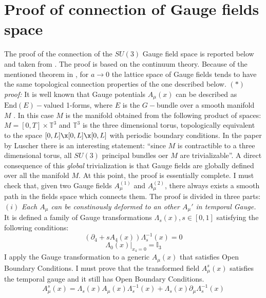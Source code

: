\documentclass[english, LaM, oneside, noexaminfo]{sapthesis}
\newcommand{\obc}{Open Boundary Conditions}
\begin{document}
\section{Proof of connection of Gauge fields space}\label{app:connection}
\noindent
The proof of the connection of the $SU(3)$ Gauge field space is reported below and taken from \cite{OBC_top}.
The proof is based on the continuum theory.
Because of the mentioned theorem in \cite{Topology-WilsonFlow-HMC}, for $a \rightarrow 0$ the lattice space of Gauge fields tends to have the same topological connection properties of the one described below.
\newline\newline
\textit{$(*)$ proof:}
\newline
It is well known that Gauge potentials $A_\mu (x)$ can be described as $\text{End}(E)-$valued 1-forms, where $E$ is the $G-$bundle over a smooth manifold $M$ \cite{Baez}.
In this case $M$ is the manifold obtained from the following product of spaces: $M = [0,T]\times \mathbb{T}^3$ and $\mathbb{T}^3$ is the three dimensional torus, topologically equivalent to the space $[0,L]\x[0,L]\x[0,L]$ with periodic boundary conditions.
\newline
In the paper by Luscher \cite{OBC_top} there is an interesting statement: ``since $M$ is contractible to a three dimensional torus, all $SU(3)$ principal bundles oer $M$ are trivializable''.
A direct consequence of this {\it global} trivialization is that Gauge fields are globally defined over all the manifold $M$.
\newline
At this point, the proof is essentially complete.
I must check that, given two Gauge fields $A_\mu^{(1)}$ and $A_\mu^{(2)}$, there always exists a smooth path in the fields space which connects them.
The proof is divided in three parts:
\newline
\newline
$(i)$ \textit{Each $A_\mu$ can be constinously deformed to an other ${A}_\mu'$ in temporal Gauge.}
\newline
It is defined a family of Gauge transformations $\Lambda_s (x), s\in [0,1]$ satisfying the following conditions:
$$\left(\partial_4 + sA_4 (x)\right) \Lambda_s^{-1} (x) = 0$$
$$\Lambda_0 (x) \big|_{x_4 = 0} = \mathbb{I}_3$$
I apply the Gauge transformation to a generic $A_\mu (x)$ that satisfies \obc.
I must prove that the transformed field $A_\mu^s (x)$ satisfies the temporal gauge and it still has \obc\space.
\begin{equation*}
    A_\mu^s (x) = \Lambda_s (x) A_\mu (x) \Lambda_s^{-1} (x) + \Lambda_s (x) \partial_\mu \Lambda_s^{-1} (x) 
\end{equation*}
\end{document}
